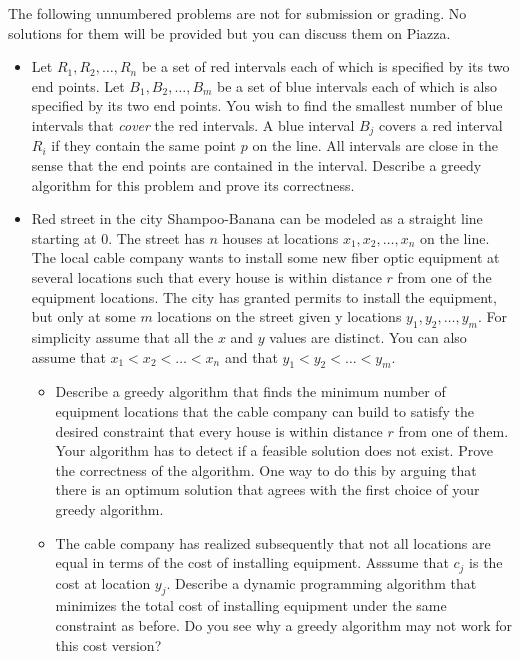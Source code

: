 \documentclass[11pt]{article}
\begin{document}
\noindent
The following unnumbered problems are not for submission or grading.
No solutions for them will be provided but you can discuss them on Piazza.
\begin{itemize}
\item  Let $R_1,R_2,\ldots,R_n$ be a set of red intervals each of which
  is specified by its two end points.  Let $B_1,B_2,\ldots, B_m$ be a
  set of blue intervals each of which is also specified by its two end
  points. You wish to find the smallest number of blue intervals that
  {\em cover} the red intervals. A blue interval $B_j$ covers a red
  interval $R_i$ if they contain the same point $p$ on the line.  All
  intervals are close in the sense that the end points are contained
  in the interval. Describe a greedy algorithm for this problem and
  prove its correctness.




\item Red street in the city Shampoo-Banana can be modeled as a
  straight line starting at $0$.  The street has $n$ houses at
  locations $x_1,x_2,\ldots,x_n$ on the line. The local cable company
  wants to install some new fiber optic equipment at several locations
  such that every house is within distance $r$ from one of the
  equipment locations. The city has granted permits to install the
  equipment, but only at some $m$ locations on the street given y
  locations $y_1,y_2, \ldots,y_m$. For simplicity assume that all the
  $x$ and $y$ values are distinct. You can also assume that
  $x_1 < x_2 < \ldots < x_n$ and that $y_1 < y_2 < \ldots < y_m$.
  \begin{itemize}
  \item Describe a greedy algorithm that finds the minimum number of
    equipment locations that the cable company can build to satisfy
    the desired constraint that every house is within distance $r$
    from one of them.  Your algorithm has to detect if a feasible
    solution does not exist. Prove the correctness of the
    algorithm. One way to do this by arguing that there is an optimum
    solution that agrees with the first choice of your greedy
    algorithm.
  \item The cable company has realized
    subsequently that not all locations are equal in terms of the cost
    of installing equipment. Asssume that $c_j$ is the cost at
    location $y_j$.  Describe a dynamic programming algorithm that
    minimizes the total cost of installing equipment under the same
    constraint as before. Do you see why a greedy algorithm may not
    work for this cost version?
  \end{itemize}

\end{itemize}
\end{document}

